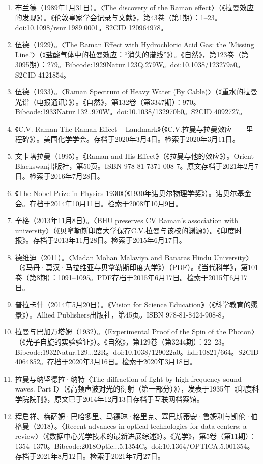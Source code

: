 \begin{enumerate}
\item 布兰德（1989年1月31日）。〈The discovery of the Raman effect〉（《拉曼效应的发现》）。《伦敦皇家学会记录与文献》，第43卷（第1期）：1–23。doi:10.1098/rsnr.1989.0001。S2CID 120964978。
\item 伍德（1929）。〈The Raman Effect with Hydrochloric Acid Gas: the 'Missing Line.'〉（《盐酸气体中的拉曼效应：“消失的谱线”》）。《自然》，第123卷（第3095期）：279。Bibcode:1929Natur.123Q.279W。doi:10.1038/123279a0。S2CID 4121854。
\item 伍德（1933）。〈Raman Spectrum of Heavy Water (By Cable)〉（《重水的拉曼光谱（电报通讯）》）。《自然》，第132卷（第3347期）：970。Bibcode:1933Natur.132..970W。doi:10.1038/132970b0。S2CID 4092727。
\item 《C.V. Raman The Raman Effect – Landmark》（《C.V.拉曼与拉曼效应——里程碑》）。美国化学学会。存档于2020年3月4日。检索于2020年3月11日。
\item 文卡塔拉曼（1995）。《Raman and His Effect》（《拉曼与他的效应》）。Orient Blackswan出版社，第50页。ISBN 978-81-7371-008-7。原文存档于2021年2月7日。检索于2016年7月28日。
\item 《The Nobel Prize in Physics 1930》（《1930年诺贝尔物理学奖》）。诺贝尔基金会。存档于2014年10月11日。检索于2008年10月9日。
\item 辛格（2013年11月8日）。〈BHU preserves CV Raman's association with university〉（《贝拿勒斯印度大学保存C.V.拉曼与该校的渊源》）。《印度时报》。存档于2013年11月28日。检索于2015年6月17日。
\item 德维迪（2011）。〈Madan Mohan Malaviya and Banaras Hindu University〉（《马丹·莫汉·马拉维亚与贝拿勒斯印度大学》）（PDF）。《当代科学》，第101卷（第8期）：1091–1095。PDF存档于2015年6月17日。检索于2015年6月17日。
\item 普拉卡什（2014年5月20日）。《Vision for Science Education》（《科学教育的愿景》）。Allied Publishers出版社，第45页。ISBN 978-81-8424-908-8。
\item 拉曼与巴加万塔姆（1932）。〈Experimental Proof of the Spin of the Photon〉（《光子自旋的实验验证》）。《自然》，第129卷（第3244期）：22–23。Bibcode:1932Natur.129...22R。doi:10.1038/129022a0。hdl:10821/664。S2CID 4064852。存档于2020年3月16日。检索于2020年3月18日。
\item 拉曼与纳坚德拉·纳特〈The diffraction of light by high-frequency sound waves. Part I〉（《高频声波对光的衍射（第一部分）》），发表于1935年《印度科学院院刊》，原文已于2014年12月13日存档于互联网档案馆。
\item 程启祥、梅萨姆·巴哈多里、马德琳·格里克、塞巴斯蒂安·鲁姆利与凯伦·伯格曼（2018）。〈Recent advances in optical technologies for data centers: a review〉（《数据中心光学技术的最新进展综述》）。《光学》，第5卷（第11期）：1354–1370。Bibcode:2018Optic...5.1354C。doi:10.1364/OPTICA.5.001354。存档于2021年8月12日。检索于2021年7月27日。

\end{enumerate}

